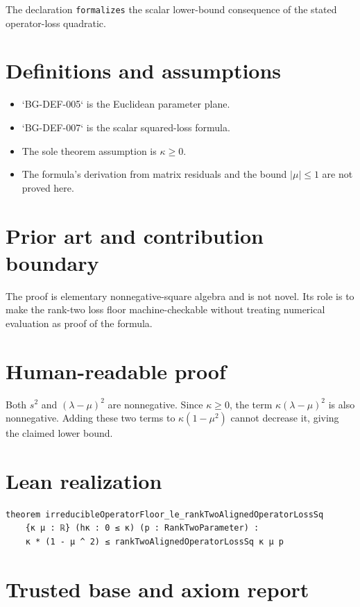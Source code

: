 \documentclass[11pt]{article}
\begin{document}
The declaration \texttt{formalizes} the scalar lower-bound consequence of the stated
operator-loss quadratic.

\section{Definitions and assumptions}

\begin{itemize}
 \item `BG-DEF-005` is the Euclidean parameter plane.
 \item `BG-DEF-007` is the scalar squared-loss formula.
 \item The sole theorem assumption is $\kappa\ge0$.
 \item The formula's derivation from matrix residuals and the bound $|\mu|\le1$ are not proved here.
\end{itemize}

\section{Prior art and contribution boundary}

The proof is elementary nonnegative-square algebra and is not novel. Its role is to
make the rank-two loss floor machine-checkable without treating numerical evaluation as
proof of the formula.

\section{Human-readable proof}

Both $s^2$ and $(\lambda-\mu)^2$ are nonnegative. Since $\kappa\ge0$, the term
$\kappa(\lambda-\mu)^2$ is also nonnegative. Adding these two terms to
$\kappa(1-\mu^2)$ cannot decrease it, giving the claimed lower bound.

\section{Lean realization}

\begin{lstlisting}
theorem irreducibleOperatorFloor_le_rankTwoAlignedOperatorLossSq
    {κ μ : ℝ} (hκ : 0 ≤ κ) (p : RankTwoParameter) :
    κ * (1 - μ ^ 2) ≤ rankTwoAlignedOperatorLossSq κ μ p
\end{lstlisting}

\section{Trusted base and axiom report}
\end{document}
